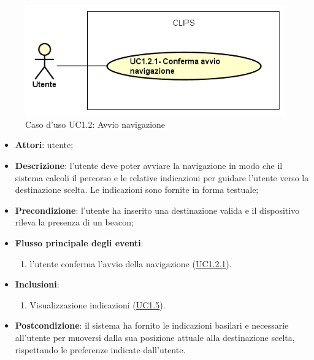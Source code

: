 \documentclass[../AnalisiDeiRequisiti.tex]{subfiles}
\begin{document}
\begin{figure}[H]
	\centering
	\includegraphics[scale=0.95, width=\textwidth]{img/UC1-2.png}
	\caption{Caso d'uso UC1.2: Avvio navigazione}\label{fig:UC1.2} 
\end{figure}
\begin{itemize}
	\item \textbf{Attori}: utente;
	\item \textbf{Descrizione}: l'utente deve poter avviare la navigazione in modo che il sistema calcoli il percorso e le relative indicazioni per guidare l'utente verso la destinazione scelta. Le indicazioni sono fornite in forma testuale; 
	\item \textbf{Precondizione}: l'utente ha inserito una destinazione valida e il dispositivo rileva la presenza di un beacon;
	
	\item \textbf{Flusso principale degli eventi}:
	\begin{enumerate}
		\item l'utente conferma l'avvio della navigazione (\hyperlink{UC1.2.1}{UC1.2.1}).
		
	\end{enumerate}
	\item \textbf{Inclusioni}:
	\begin{enumerate}
		\item Visualizzazione indicazioni (\hyperlink{UC1.5}{UC1.5}).
		
	\end{enumerate}
	\item \textbf{Postcondizione}: il sistema ha fornito le indicazioni basilari  e necessarie all'utente per muoversi dalla sua posizione attuale alla destinazione scelta, rispettando le preferenze indicate dall'utente.
\end{itemize}
\hypertarget{UC1.2.1}{}
\end{document}
